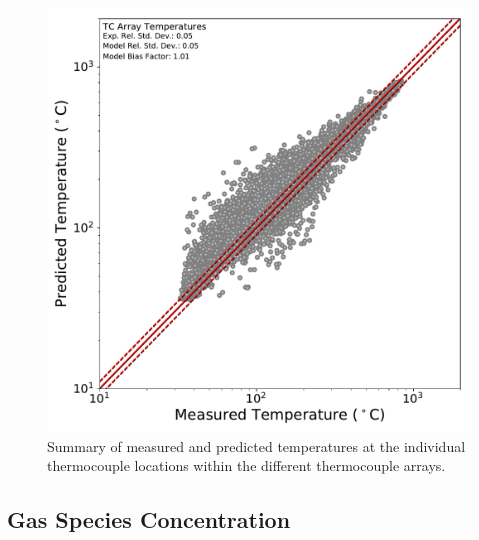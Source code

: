 \begin{figure}[!h]
	\centering
	\includegraphics[width=\columnwidth]{Figures/Plots/Validation/Temperature/loglog_TC_arrays}
	\caption{Summary of measured and predicted temperatures at the individual thermocouple locations within the different thermocouple arrays.}
	\label{fig:loglog_TC_arrays}
\end{figure}

\clearpage
\subsection{Gas Species Concentration}
